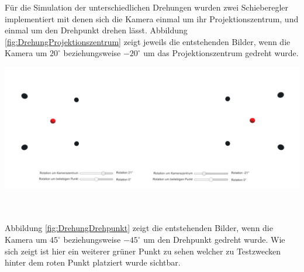 %
%
%

Für die Simulation der unterschiedlichen Drehungen wurden zwei Schieberegler implementiert mit denen sich die Kamera einmal um ihr Projektionszentrum, und einmal um den Drehpunkt drehen lässt. Abbildung \ref{fig:DrehungProjektionszentrum} zeigt jeweils die entstehenden Bilder, wenn die Kamera um \ensuremath{20^\circ} beziehungsweise \ensuremath{-20^\circ} um das Projektionszentrum gedreht wurde.


\begin{minipage}{\linewidth}
	\centering
	\includegraphics[width=1.\linewidth]{images/DrehungPZ.png}
	\label{fig:DrehungProjektionszentrum}
\end{minipage}\\ \\

Abbildung \ref{fig:DrehungDrehpunkt} zeigt die entstehenden Bilder, wenn die Kamera um \ensuremath{45^\circ} beziehungsweise \ensuremath{-45^\circ} um den Drehpunkt gedreht wurde. Wie sich zeigt ist hier ein weiterer grüner Punkt zu sehen welcher zu Testzwecken hinter dem roten Punkt platziert wurde sichtbar.

